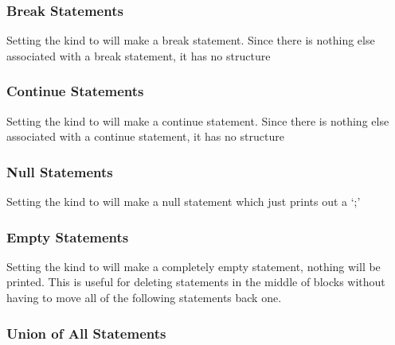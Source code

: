 \subsubsection{Break Statements}

Setting the  kind to  will make a
break statement.  Since there is nothing else associated with a break
statement, it has no structure

\subsubsection{Continue Statements}

Setting the  kind to  will
make a continue statement.  Since there is nothing else associated with a
continue statement, it has no structure

\subsubsection{Null Statements}

Setting the  kind to  will make a
null statement which just prints out a `;'

\subsubsection{Empty Statements}

Setting the  kind to  will make a
completely empty statement, nothing will be printed.  This is useful for
deleting statements in the middle of blocks without having to move all of the
following statements back one.

\subsubsection{Union of All Statements}

